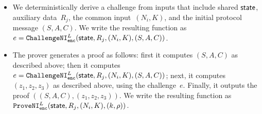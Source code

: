 \documentclass[11pt]{article}
\newcommand{\jnote}[1]{{\textcolor{blue}{Jon's note: #1}}}
\newcommand{\dnote}[1]{{\textcolor{Orange}{Denis: #1}}}
\def\state{{\sf state}}
\newcommand{\sid}{\ensuremath{\mathtt{sid}}}
\newcommand{\commit}[1]{\ensuremath{\mathtt{Commit}_{\mathtt{#1}}}}
\newcommand{\challengeni}[1]{\ensuremath{\mathtt{ChallengeNI}_{\mathtt{#1}}}}
\newcommand{\proveni}[1]{\ensuremath{\mathtt{ProveNI}_{\mathtt{#1}}}}
\newcommand{\?}[1]{\stackrel{?}{#1}}
\begin{document}
\begin{itemize}
    \item We deterministically derive a challenge from inputs that include shared $\state$, auxiliary data~$R_j$, the common input~$(N_i, K)$, and the initial protocol message $(S, A, C)$.    
    We write the resulting function as 
    $e = \challengeni{enc}^{L}(\state, R_j, (N_i, K), (S, A, C))$.

    

    
    \item The prover generates a proof as follows: first it computes $(S, A, C)$ as described above; then it computes $e = \challengeni{enc}^{L}(\state, R_j, (N_i, K), (S, A, C))$; next, it computes $(z_1, z_2, z_3)$ as described above, using the challenge~$e$. Finally, it outputs the proof $((S, A, C), (z_1, z_2, z_3))$. We write the resulting function as $\proveni{enc}^{L}(\state, R_j, (N_i, K), (k, \rho))$.
    
        




\end{itemize}
\end{document}

